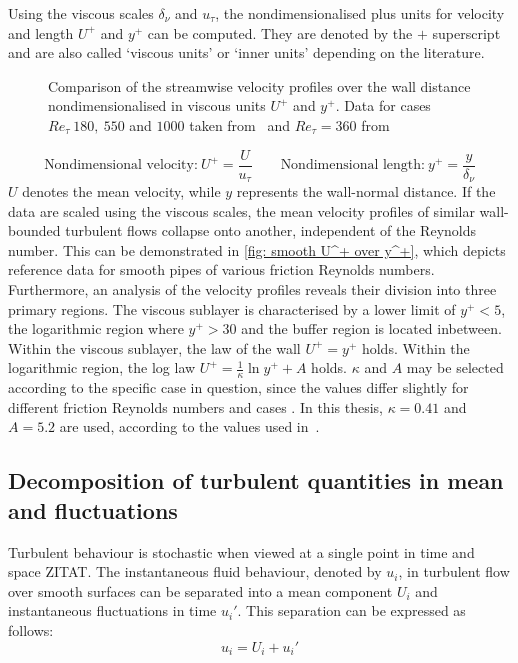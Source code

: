 Using the viscous scales $\delta_\nu$ and $u_\tau$, the nondimensionalised plus units for velocity and length $U^+$ and $y^+$ can be computed.
They are denoted by the $+$ superscript and are also called `viscous units' or `inner units' depending on the literature.
\begin{figure}
    \centering
    
    \caption{Comparison of the streamwise velocity profiles over the wall distance nondimensionalised in viscous units $U^+$ and $y^+$. Data for cases $Re_\tau \ 180,\ 550$ and $1000$ taken from~\cite{yaoDirectNumericalSimulations2023} and $Re_\tau = 360$ from~\cite{elkhouryDirectNumericalSimulation2013}}
    \label{fig: smooth U^+ over y^+}
\end{figure}
\begin{equation}
    \text{Nondimensional velocity:}\ U^+ = \frac{U}{u_\tau} \qquad \text{Nondimensional length:}\ y^+ = \frac{y}{\delta_\nu}
\end{equation}
$U$ denotes the mean velocity, while $y$ represents the wall-normal distance.
If the data are scaled using the viscous scales, the mean velocity profiles of similar wall-bounded turbulent flows collapse onto another, independent of the Reynolds number.  This can be demonstrated in \autoref{fig: smooth U^+ over y^+}, which depicts reference data for smooth pipes of various friction Reynolds numbers.
Furthermore, an analysis of the velocity profiles reveals their division into three primary regions.
The viscous sublayer is characterised by a lower limit of  $y^+ < 5$, the logarithmic region where $y^+ > 30$ and the buffer region is located inbetween.
Within the viscous sublayer, the law of the wall $U^+ = y^+$ holds. 
Within the logarithmic region, the log law $U^+ = \frac{1}{\kappa}\ln{y^+} + A$ holds.
$\kappa$ and $A$ may be selected  according to the specific case in question, since the values differ slightly for different friction Reynolds numbers and cases \citep{popeTurbulentFlows2015}.
In this thesis, $\kappa = 0.41$ and $A = 5.2$ are used, according to the values used in~\cite{popeTurbulentFlows2015}.



\subsection{Decomposition of turbulent quantities in mean and fluctuations}\label{subsec: decomposition of turbulent quantities}
Turbulent behaviour is stochastic when viewed at a single point in time and space ZITAT.
The instantaneous fluid behaviour, denoted by $u_i$,  in turbulent flow over smooth surfaces can be separated into a mean component $U_i$ and instantaneous fluctuations in time $u_i'$.  This separation can be expressed as follows:
\begin{equation}
     u_{i} = U_i + u_i' 
\end{equation}

